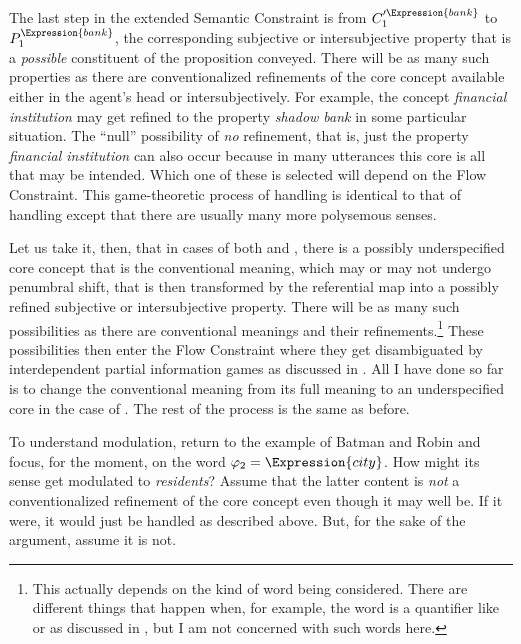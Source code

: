 The last step in the extended Semantic Constraint is from $C'^{\Expression{bank}}_1$ to $P^{\Expression{bank}}_1$, the corresponding subjective or intersubjective property that is a \emph{possible} constituent of the proposition conveyed. There will be as many such properties as there are conventionalized refinements of the core concept available either in the agent's head or intersubjectively. For example, the concept \emph{financial institution} may get refined to the property \emph{shadow bank} in some particular situation. The ``null'' possibility of \emph{no} refinement, that is, just the property \emph{financial institution} can also occur because in many utterances this core is all that may be intended. Which one of these is selected will depend on the Flow Constraint. This game-theoretic process of handling  is identical to that of handling  except that there are usually many more polysemous senses.\largerpage[1.5]

Let us take it, then, that in cases of both  and , there is a possibly underspecified core concept that is the conventional meaning, which may or may not undergo penumbral shift, that is then transformed by the referential map into a possibly refined subjective or intersubjective property. There will be as many such possibilities as there are conventional meanings and their refinements.{\footnote{This actually depends on the kind of word being considered. There are different things that happen when, for example, the word is a quantifier like  or  as discussed in \citet[Chapter~6]{parikh:le}, but I am not concerned with such words here.}} These possibilities then enter the Flow Constraint where they get disambiguated by interdependent partial information games as discussed in . All I have done so far is to change the conventional meaning from its full meaning to an underspecified core in the case of . The rest of the process is the same as before.\largerpage

To understand modulation, return to the example of Batman and Robin and focus, for the moment, on the word $\varphi_2 = \Expression{city}$. How might its sense get modulated to \emph{residents}? Assume that the latter content is \emph{not} a conventionalized refinement of the core concept even though it may well be. If it were, it would just be handled as described above. But, for the sake of the argument, assume it is not.

